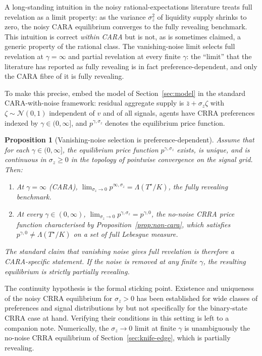 \documentclass[12pt,letterpaper]{article}
\newtheorem{proposition}{Proposition}
\theoremstyle{definition}
\theoremstyle{remark}
\newcommand{\Lam}{\Lambda}            %
\newcommand{\Tstar}{T^{\!\star}}
\newcommand{\1}{\mathbf{1}}
\begin{document}
A long-standing intuition in the noisy rational-expectations literature
treats full revelation as a limit property: as the variance $\sigma_{z}^{2}$
of liquidity supply shrinks to zero, the noisy CARA equilibrium converges
to the fully revealing benchmark. This intuition is correct \emph{within
CARA} but is not, as is sometimes claimed, a generic property of the
rational class. The vanishing-noise limit selects full revelation at
$\gamma=\infty$ and partial revelation at every finite $\gamma$: the
``limit'' that the literature has reported as fully revealing is in fact
preference-dependent, and only the CARA fibre of it is fully revealing.

To make this precise, embed the model of Section~\ref{sec:model} in the
standard CARA-with-noise framework: residual aggregate supply is
$\bar z + \sigma_{z}\zeta$ with $\zeta\sim\mathcal{N}(0,1)$ independent
of $v$ and of all signals, agents have CRRA preferences indexed by
$\gamma\in(0,\infty]$, and $p^{\gamma,\sigma_{z}}$ denotes the equilibrium
price function.

\begin{proposition}[Vanishing-noise selection is preference-dependent]\label{prop:vanishing}
Assume that for each $\gamma\in(0,\infty]$, the equilibrium price function
$p^{\gamma,\sigma_{z}}$ exists, is unique, and is continuous in
$\sigma_{z}\geq 0$ in the topology of pointwise convergence on the signal
grid. Then:
\begin{enumerate}[label=\textnormal{(\roman*)},topsep=2pt,itemsep=2pt]
\item At $\gamma=\infty$ (CARA),
$\lim_{\sigma_{z}\to 0}p^{\infty,\sigma_{z}}=\Lam(\Tstar/K)$, the fully
revealing benchmark.
\item At every $\gamma\in(0,\infty)$,
$\lim_{\sigma_{z}\to 0}p^{\gamma,\sigma_{z}}=p^{\gamma,0}$, the no-noise
CRRA price function characterised by Proposition~\ref{prop:non-cara},
which satisfies $p^{\gamma,0}\neq\Lam(\Tstar/K)$ on a set of full
Lebesgue measure.
\end{enumerate}
The standard claim that vanishing noise gives full revelation is therefore
a CARA-specific statement. If the noise is removed at any finite
$\gamma$, the resulting equilibrium is strictly partially revealing.
\end{proposition}

The continuity hypothesis is the formal sticking point. Existence
and uniqueness of the noisy CRRA equilibrium for $\sigma_{z}>0$ has been
established for wide classes of preferences and signal distributions by
\citet{BreonDrish2015} but not specifically for the binary-state CRRA
case at hand. Verifying their conditions in this setting is left to a
companion note. Numerically, the $\sigma_{z}\to 0$ limit at finite
$\gamma$ is unambiguously the no-noise CRRA equilibrium of
Section~\ref{sec:knife-edge}, which is partially revealing.
\end{document}
